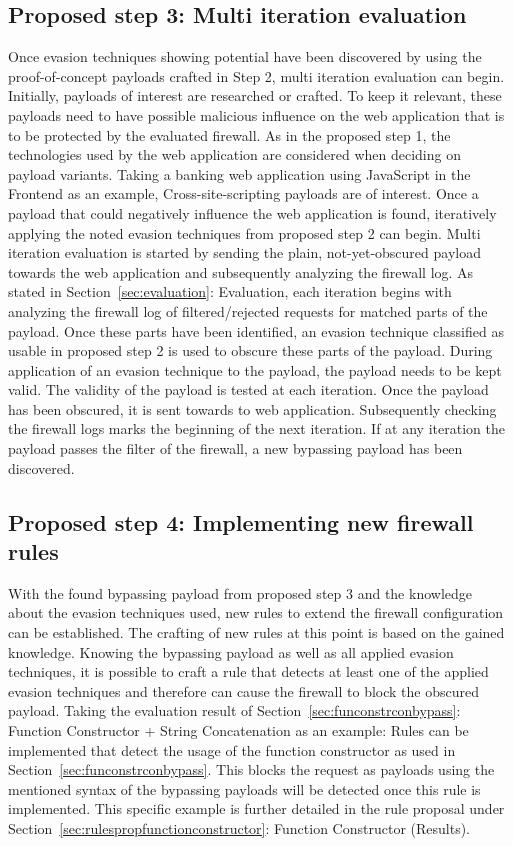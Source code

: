 \subsection{Proposed step 3: Multi iteration evaluation}
\label{sec:genericproposalstep3}
Once evasion techniques showing potential have been discovered by using the proof-of-concept payloads crafted in Step 2, multi iteration evaluation can begin. Initially, payloads of interest are researched or crafted. To keep it relevant, these payloads need to have possible malicious influence on the web application that is to be protected by the evaluated firewall. As in the proposed step 1, the technologies used by the web application are considered when deciding on payload variants. Taking a banking web application using JavaScript in the Frontend as an example, Cross-site-scripting payloads are of interest. Once a payload that could negatively influence the web application is found, iteratively applying the noted evasion techniques from proposed step 2 can begin. Multi iteration evaluation is started by sending the plain, not-yet-obscured payload towards the web application and subsequently analyzing the firewall log. As stated in Section~\ref{sec:evaluation}: Evaluation, each iteration begins with analyzing the firewall log of filtered/rejected requests for matched parts of the payload. Once these parts have been identified, an evasion technique classified as usable in proposed step 2 is used to obscure these parts of the payload. During application of an evasion technique to the payload, the payload needs to be kept valid. The validity of the payload is tested at each iteration. Once the payload has been obscured, it is sent towards to web application. Subsequently checking the firewall logs marks the beginning of the next iteration. If at any iteration the payload passes the filter of the firewall, a new bypassing payload has been discovered.

\subsection{Proposed step 4: Implementing new firewall rules}
With the found bypassing payload from proposed step 3 and the knowledge about the evasion techniques used, new rules to extend the firewall configuration can be established. The crafting of new rules at this point is based on the gained knowledge. Knowing the bypassing payload as well as all applied evasion techniques, it is possible to craft a rule that detects at least one of the applied evasion techniques and therefore can cause the firewall to block the obscured payload. 
Taking the evaluation result of Section~\ref{sec:funconstrconbypass}: Function Constructor + String Concatenation as an example: Rules can be implemented that detect the usage of the function constructor as used in Section~\ref{sec:funconstrconbypass}. This blocks the request as payloads using the mentioned syntax of the bypassing payloads will be detected once this rule is implemented. This specific example is further detailed in the rule proposal under Section~\ref{sec:rulespropfunctionconstructor}: Function Constructor (Results).

